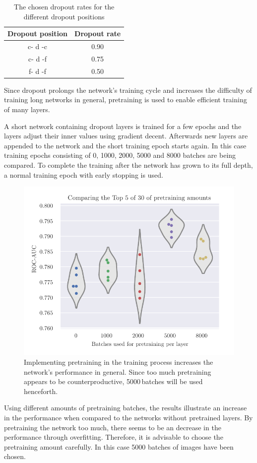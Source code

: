 \begin{table}
    \centering
    \caption{The chosen dropout rates for the different dropout positions}
    \label{tab:dropout_rates}
    \begin{tabular}{cc}
        \toprule
        {Dropout position}  & {Dropout rate} \\
        \midrule
        c- d -c & 0.90 \\
        c- d -f & 0.75 \\
        f- d -f & 0.50 \\
        \bottomrule
    \end{tabular}
\end{table}

Since dropout prolongs the network's training cycle and increases the difficulty of training long networks in general,
pretraining is used to enable efficient training of many layers.

A short network containing dropout layers is trained for a few epochs
and the layers adjust their inner values using gradient decent.
Afterwards new layers are appended to the network and the short training epoch starts again.
In this case training epochs consisting of \num{0}, \num{1000}, \num{2000}, \num{5000} and \num{8000} batches are being compared.
To complete the training after the network has grown to its full depth, a normal training epoch with early stopping is used.

\begin{figure}
    \centering
    \includegraphics[scale=1]{Plots/Pretraining_Amounts.pdf}
    \caption{Implementing pretraining in the training process increases the network's performance in general. Since too much pretraining appears to be counterproductive, \num{5000}\,batches will be used henceforth.}
    \label{fig:pretraining_amounts}
\end{figure}

Using different amounts of pretraining batches, the results illustrate an increase in the performance
when compared to the networks without pretrained layers.
By pretraining the network too much, there seems to be an decrease in the performance through overfitting.
Therefore, it is advisable to choose the pretraining amount carefully.
In this case \num{5000} batches of images have been chosen.
